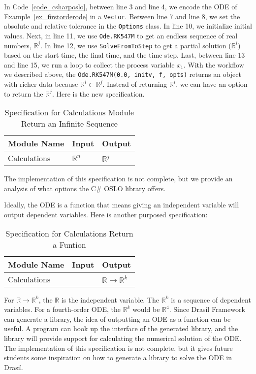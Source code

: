 In Code~\ref{code_csharposlo}, between line 3 and line 4, we encode the ODE of Example~\ref{ex_firstorderode} in a \verb|Vector|. Between line 7 and line 8, we set the absolute and relative tolerance in the \verb|Options| class. In line 10, we initialize initial values. Next, in line 11, we use \verb|Ode.RK547M| to get an endless sequence of real numbers, $\mathbb{R}^j$. In line 12, we use \verb|SolveFromToStep| to get a partial solution ($\mathbb{R}^i$) based on the start time, the final time, and the time step. Last, between line 13 and line 15, we run a loop to collect the process variable $x_1$. With the workflow we described above, the \verb|Ode.RK547M(0.0, initv, f, opts)| returns an object with richer data because {}$\mathbb{R}^i \subset \mathbb{R}^j$. Instead of returning $\mathbb{R}^i$, we can have an option to return the $\mathbb{R}^j$. Here is the new specification.
\begin{table}[ht]
\centering
\begin{tabular}{p{} | p{} | p{}} \hline
    \textbf{Module Name}&\textbf{Input}&\textbf{Output}\\
    \toprule
    Calculations & $\mathbb{R}^n$ & $\mathbb{R}^j$ \\
    \bottomrule	
\end{tabular}	
\caption{Specification for Calculations Module Return an Infinite Sequence}	
\label{tab_srsforcal}
\end{table}
The implementation of this specification is not complete, but we provide an analysis of what options the C\# OSLO library offers.

Ideally, the ODE is a function that means giving an independent variable will output dependent variables. Here is another purposed specification:
\begin{table}[ht]
\centering
\begin{tabular}{p{} | p{} | p{}} \hline
    \textbf{Module Name}&\textbf{Input}&\textbf{Output}\\
    \toprule
    Calculations & & $\mathbb{R} \rightarrow \mathbb{R}^k$ \\
    \bottomrule	
\end{tabular}	
\caption{Specification for Calculations Return a Funtion}	
\label{tab_srsforcal}
\end{table}

For $\mathbb{R} \rightarrow \mathbb{R}^k$, the $\mathbb{R}$ is the independent variable. The $\mathbb{R}^k$ is a sequence of dependent variables. For a fourth-order ODE, the $\mathbb{R}^k$ would be $\mathbb{R}^4$. Since Drasil Framework can generate a library, the idea of outputting an ODE as a function can be useful. A program can hook up the interface of the generated library, and the library will provide support for calculating the numerical solution of the ODE. The implementation of this specification is not complete, but it gives future students some inspiration on how to generate a library to solve the ODE in Drasil.

